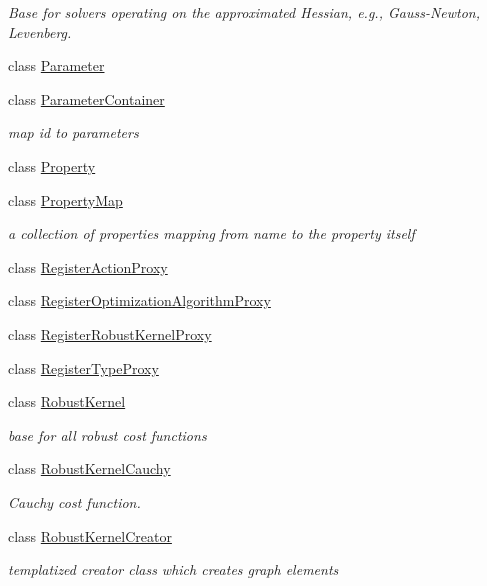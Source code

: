 \begin{DoxyCompactItemize}
\begin{DoxyCompactList}\small\item\em Base for solvers operating on the approximated Hessian, e.\+g., Gauss-\/\+Newton, Levenberg. \end{DoxyCompactList}\item 
class \mbox{\hyperlink{classg2o_1_1_parameter}{Parameter}}
\item 
class \mbox{\hyperlink{classg2o_1_1_parameter_container}{Parameter\+Container}}
\begin{DoxyCompactList}\small\item\em map id to parameters \end{DoxyCompactList}\item 
class \mbox{\hyperlink{classg2o_1_1_property}{Property}}
\item 
class \mbox{\hyperlink{classg2o_1_1_property_map}{Property\+Map}}
\begin{DoxyCompactList}\small\item\em a collection of properties mapping from name to the property itself \end{DoxyCompactList}\item 
class \mbox{\hyperlink{classg2o_1_1_register_action_proxy}{Register\+Action\+Proxy}}
\item 
class \mbox{\hyperlink{classg2o_1_1_register_optimization_algorithm_proxy}{Register\+Optimization\+Algorithm\+Proxy}}
\item 
class \mbox{\hyperlink{classg2o_1_1_register_robust_kernel_proxy}{Register\+Robust\+Kernel\+Proxy}}
\item 
class \mbox{\hyperlink{classg2o_1_1_register_type_proxy}{Register\+Type\+Proxy}}
\item 
class \mbox{\hyperlink{classg2o_1_1_robust_kernel}{Robust\+Kernel}}
\begin{DoxyCompactList}\small\item\em base for all robust cost functions \end{DoxyCompactList}\item 
class \mbox{\hyperlink{classg2o_1_1_robust_kernel_cauchy}{Robust\+Kernel\+Cauchy}}
\begin{DoxyCompactList}\small\item\em Cauchy cost function. \end{DoxyCompactList}\item 
class \mbox{\hyperlink{classg2o_1_1_robust_kernel_creator}{Robust\+Kernel\+Creator}}
\begin{DoxyCompactList}\small\item\em templatized creator class which creates graph elements \end{DoxyCompactList}\item 

\end{DoxyCompactItemize}
